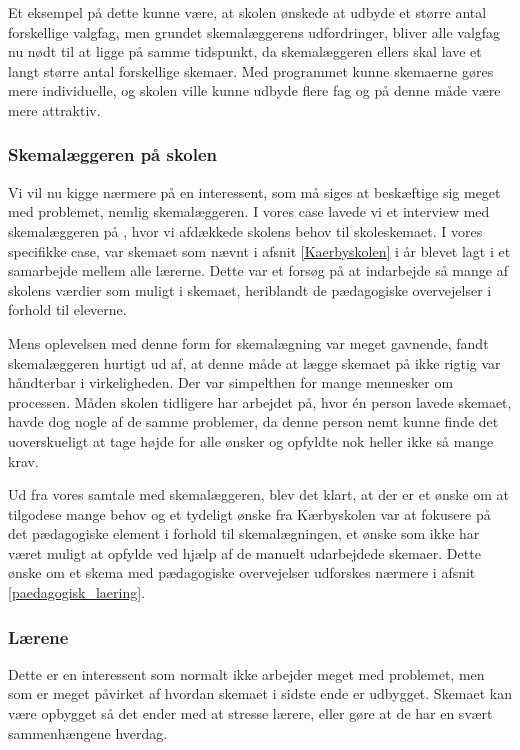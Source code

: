 Et eksempel på dette kunne være, at skolen ønskede at udbyde et større antal forskellige valgfag, men grundet skemalæggerens udfordringer, bliver alle valgfag nu nødt til at ligge på samme tidspunkt, da skemalæggeren ellers skal lave et langt større antal forskellige skemaer. Med programmet kunne skemaerne gøres mere individuelle, og skolen ville kunne udbyde flere fag og på denne måde være mere attraktiv.

\subsubsection{Skemalæggeren på skolen}
Vi vil nu kigge nærmere på en interessent, som må siges at beskæftige sig meget med problemet, nemlig skemalæggeren. I vores case lavede vi et interview med skemalæggeren på \school, hvor vi afdækkede skolens behov til skoleskemaet. I vores specifikke case, var skemaet som nævnt i afsnit \ref{Kaerbyskolen} i år blevet lagt i et samarbejde mellem alle lærerne. Dette var et forsøg på at indarbejde så mange af skolens værdier som muligt i skemaet, heriblandt de pædagogiske overvejelser i forhold til eleverne.

Mens oplevelsen med denne form for skemalægning var meget gavnende, fandt skemalæggeren hurtigt ud af, at denne måde at lægge skemaet på ikke rigtig var håndterbar i virkeligheden. Der var simpelthen for mange mennesker om processen. Måden skolen tidligere har arbejdet på, hvor \'en person lavede skemaet, havde dog nogle af de samme problemer, da denne person nemt kunne finde det uoverskueligt at tage højde for alle ønsker og opfyldte nok heller ikke så mange krav.

Ud fra vores samtale med skemalæggeren, blev det klart, at der er et ønske om at tilgodese mange behov og et tydeligt ønske fra Kærbyskolen var at fokusere på det pædagogiske element i forhold til skemalægningen, et ønske som ikke har været muligt at opfylde ved hjælp af de manuelt udarbejdede skemaer. Dette ønske om et skema med pædagogiske overvejelser udforskes nærmere i afsnit \ref{paedagogisk_laering}.

\subsubsection{Lærene}
Dette er en interessent som normalt ikke arbejder meget med problemet, men som er meget påvirket af hvordan skemaet i sidste ende er udbygget.  Skemaet kan være opbygget så det ender med at stresse lærere, eller gøre at de har en svært sammenhængene hverdag. 

